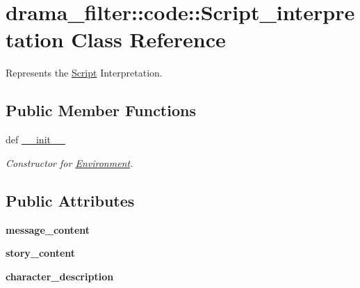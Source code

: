 \hypertarget{classdrama__filter_1_1code_1_1Script__interpretation}{
\section{drama\_\-filter::code::Script\_\-interpretation Class Reference}
\label{classdrama__filter_1_1code_1_1Script__interpretation}
}


Represents the \hyperlink{classdrama__filter_1_1code_1_1Script}{Script} Interpretation.  


\subsection*{Public Member Functions}
\begin{DoxyCompactItemize}
\item 
def \hyperlink{classdrama__filter_1_1code_1_1Script__interpretation_ab8dc29680689d752f2e46bb70eb528a4}{\_\-\_\-init\_\-\_\-}
\begin{DoxyCompactList}\small\item\em Constructor for \hyperlink{classdrama__filter_1_1code_1_1Environment}{Environment}. \end{DoxyCompactList}\end{DoxyCompactItemize}
\subsection*{Public Attributes}
\begin{DoxyCompactItemize}
\item 
\hypertarget{classdrama__filter_1_1code_1_1Script__interpretation_a299dca12cf8808d67de06d03def5d492}{
{\bfseries message\_\-content}}
\label{classdrama__filter_1_1code_1_1Script__interpretation_a299dca12cf8808d67de06d03def5d492}

\item 
\hypertarget{classdrama__filter_1_1code_1_1Script__interpretation_a6058c64347097c435a98d5557bdf4871}{
{\bfseries story\_\-content}}
\label{classdrama__filter_1_1code_1_1Script__interpretation_a6058c64347097c435a98d5557bdf4871}

\item 
\hypertarget{classdrama__filter_1_1code_1_1Script__interpretation_ad3c2c64f6e429769b772ba7b98a97a12}{
{\bfseries character\_\-description}}
\label{classdrama__filter_1_1code_1_1Script__interpretation_ad3c2c64f6e429769b772ba7b98a97a12}

\end{DoxyCompactItemize}


